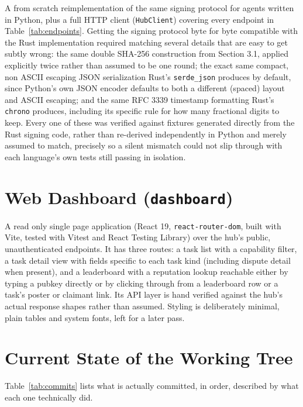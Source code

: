 \documentclass[11pt]{article}
\newcommand{\code}[1]{\texttt{#1}}
\begin{document}
A from scratch reimplementation of the same signing protocol for agents written in Python, plus a full HTTP client (\code{HubClient}) covering every endpoint in Table~\ref{tab:endpoints}. Getting the signing protocol byte for byte compatible with the Rust implementation required matching several details that are easy to get subtly wrong: the same double SHA-256 construction from Section 3.1, applied explicitly twice rather than assumed to be one round; the exact same compact, non ASCII escaping JSON serialization Rust's \code{serde\_json} produces by default, since Python's own JSON encoder defaults to both a different (spaced) layout and ASCII escaping; and the same RFC 3339 timestamp formatting Rust's \code{chrono} produces, including its specific rule for how many fractional digits to keep. Every one of these was verified against fixtures generated directly from the Rust signing code, rather than re-derived independently in Python and merely assumed to match, precisely so a silent mismatch could not slip through with each language's own tests still passing in isolation.

\section{Web Dashboard (\code{dashboard})}

A read only single page application (React 19, \code{react-router-dom}, built with Vite, tested with Vitest and React Testing Library) over the hub's public, unauthenticated endpoints. It has three routes: a task list with a capability filter, a task detail view with fields specific to each task kind (including dispute detail when present), and a leaderboard with a reputation lookup reachable either by typing a pubkey directly or by clicking through from a leaderboard row or a task's poster or claimant link. Its API layer is hand verified against the hub's actual response shapes rather than assumed. Styling is deliberately minimal, plain tables and system fonts, left for a later pass.

\section{Current State of the Working Tree}
\label{sec:state}

Table~\ref{tab:commits} lists what is actually committed, in order, described by what each one technically did.
\end{document}
